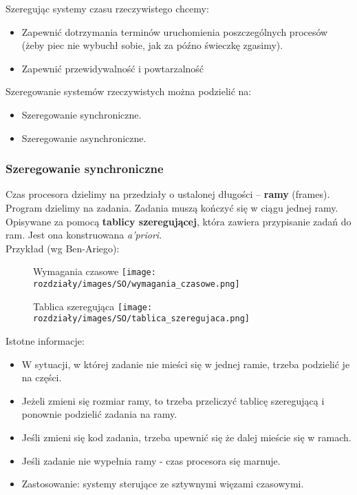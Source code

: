 Szeregując systemy czasu rzeczywistego chcemy:
\begin{itemize}
    \item Zapewnić dotrzymania terminów uruchomienia poszczególnych procesów  (żeby piec nie wybuchł sobie, jak za późno świeczkę zgasimy).
    \item Zapewnić przewidywalność i powtarzalność
\end{itemize}

Szeregowanie systemów rzeczywistych można podzielić na:
\begin{itemize}
    \item Szeregowanie synchroniczne.
    \item Szeregowanie asynchroniczne.
\end{itemize}

\subsubsection{Szeregowanie synchroniczne}
    Czas procesora dzielimy na przedziały o ustalonej długości – \textbf{ramy} (frames). Program dzielimy na zadania. Zadania muszą kończyć się w ciągu jednej ramy. Opisywane za pomocą \textbf{tablicy szeregującej}, która zawiera przypisanie zadań do ram. Jest ona konstruowana \textit{a'priori}. \\ 
    
    Przykład (wg Ben-Ariego):
    \begin{figure}[!htb]
        \begin{minipage}{0.4\textwidth}
            \centering
            Wymagania czasowe
            \texttt{[image: rozdziały/images/SO/wymagania\_czasowe.png]}
        \end{minipage}\hfill
        \begin{minipage}{0.5\textwidth}
            \centering
            Tablica szeregująca
            \texttt{[image: rozdziały/images/SO/tablica\_szeregujaca.png]}
        \end{minipage}
    \end{figure}
    

    Istotne informacje:
    \begin{itemize}
        \item W sytuacji, w której zadanie nie mieści się w jednej ramie, trzeba podzielić je na części.
        \item Jeżeli zmieni się rozmiar ramy, to trzeba przeliczyć tablicę szeregującą i ponownie podzielić zadania na ramy.
        \item Jeśli zmieni się kod zadania, trzeba upewnić się że dalej mieście się w ramach.
        \item Jeśli zadanie nie wypełnia ramy - czas procesora się marnuje.
        \item Zastosowanie: systemy sterujące ze sztywnymi więzami czasowymi.
    \end{itemize}
    
